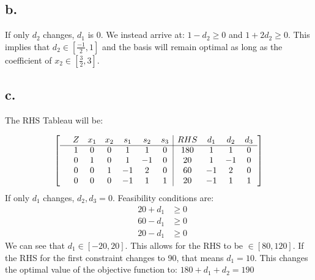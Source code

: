 \documentclass[10pt, letterpaper]{paper}
\begin{document}
\subsection*{b.}
If only $d_2$ changes, $d_1$ is 0.
We instead arrive at: $1 - d_2 \geq 0$ and $1 + 2d_2 \geq 0$. This implies that $d_2 \in [\frac{-1}{2},1]$ and the basis will remain optimal as long as the coefficient of $x_2 \in [\frac{3}{2}, 3]$. 

\subsection*{c.}
The RHS Tableau will be: 

\[
	\left[ {\begin{array}{ccccccc|cccc}
	  & Z & x_1 & x_2 & s_1 & s_2 & s_3 & RHS & d_1 & d_2 & d_3\\ \cline{1-11}
	 &   1 & 0 & 0 & 1  & 1  & 0 & 180& 1 & 1 & 0 \\
	 & 0 & 1 & 0 & 1  & -1 & 0 & 20 & 1 & -1 & 0 \\
	 & 0 & 0 & 1 & -1 & 2  & 0 & 60 & -1 & 2 & 0 \\
	 &   0 & 0 & 0 & -1 & 1  & 1 & 20 & -1 & 1 & 1\\
	\end{array} } \right]
\]
If only $d_1$ changes, $d_2,d_3 = 0$. Feasibility conditions are:
\begin{equation*}
\begin{alignedat}{3}
&20 + d_1  &\geq 0\\
&60 - d_1  &\geq 0\\
&20-d_1 &\geq 0
\end{alignedat}
\end{equation*}
We can see that $d_1 \in [-20,20]$. This allows for the RHS to be $\in [80,120]$. If the RHS for the first constraint changes to 90, that means $d_1 = 10$. This changes the optimal value of the objective function to: $180 + d_1 + d_2 = 190$
\end{document}
